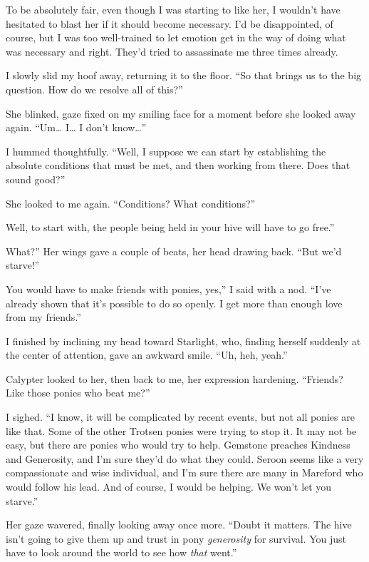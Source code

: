 To be absolutely fair, even though I was starting to like her, I wouldn’t have hesitated to blast her if it should become necessary. I’d be disappointed, of course, but I was too well-trained to let emotion get in the way of doing what was necessary and right. They’d tried to assassinate me three times already.

I slowly slid my hoof away, returning it to the floor. “So that brings us to the big question. How do we resolve all of this?”

She blinked, gaze fixed on my smiling face for a moment before she looked away again. “Um… I… I don’t know…”

I hummed thoughtfully. “Well, I suppose we can start by establishing the absolute conditions that must be met, and then working from there. Does that sound good?”

She looked to me again. “Conditions? What conditions?”

\leavevmode{}Well, to start with, the people being held in your hive will have to go free.”

\leavevmode{}What?” Her wings gave a couple of beats, her head drawing back. “But we’d starve!”

\leavevmode{}You would have to make friends with ponies, yes,” I said with a nod. “I’ve already shown that it’s possible to do so openly. I get more than enough love from my friends.”

I finished by inclining my head toward Starlight, who, finding herself suddenly at the center of attention, gave an awkward smile. “Uh, heh, yeah.”

Calypter looked to her, then back to me, her expression hardening. “Friends? Like those ponies who beat me?”

I sighed. “I know, it will be complicated by recent events, but not all ponies are like that. Some of the other Trotsen ponies were trying to stop it. It may not be easy, but there are ponies who would try to help. Gemstone preaches Kindness and Generosity, and I’m sure they’d do what they could. Seroon seems like a very compassionate and wise individual, and I’m sure there are many in Mareford who would follow his lead. And of course, I would be helping. We won’t let you starve.”

Her gaze wavered, finally looking away once more. “Doubt it matters. The hive isn’t going to give them up and trust in pony \textit{generosity} for survival. You just have to look around the world to see how \textit{that} went.”

